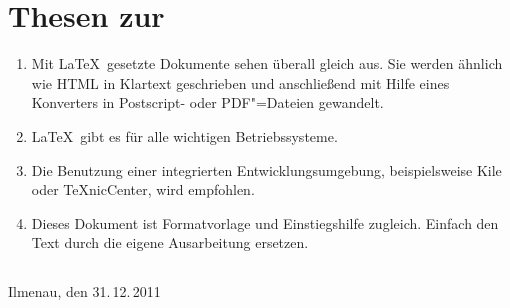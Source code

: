 %
%
%
%

\chapter*{Thesen zur \artderausarbeitung}

\begin{enumerate}
\item Mit \LaTeX\ gesetzte Dokumente sehen überall
      gleich aus. Sie werden ähnlich wie HTML in Klartext
      geschrieben und anschließend mit Hilfe eines Konverters in
      Postscript- oder PDF"=Dateien gewandelt.
\item \LaTeX\ gibt es für alle wichtigen Betriebssysteme.
\item Die Benutzung einer integrierten Entwicklungsumgebung,
      beispielsweise {\ttfamily Kile} oder {\ttfamily TeXnicCenter},
      wird empfohlen.
\item Dieses Dokument ist Formatvorlage und Einstiegshilfe
      zugleich. Einfach den Text durch die eigene Ausarbeitung
      ersetzen.
\end{enumerate}

\section*{}

Ilmenau, den 31.\,12.\,2011\hfill \namedesautors
